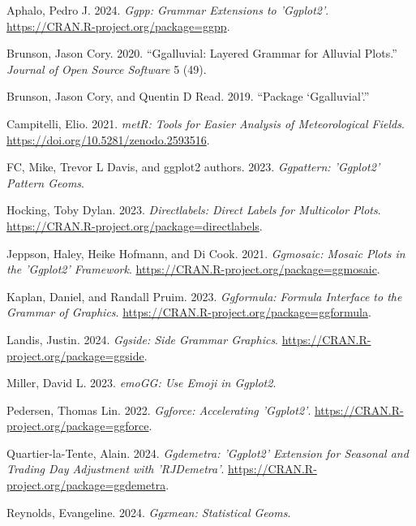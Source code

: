\documentclass[
  letterpaper,
  DIV=11,
  numbers=noendperiod]{scrreprt}
\newlength{\cslhangindent}
\newenvironment{CSLReferences}[2] %
 {\begin{list}{}{%
  \setlength{\itemindent}{0pt}
  \setlength{\leftmargin}{0pt}
  \setlength{\parsep}{0pt}
  \ifodd #1
   \setlength{\leftmargin}{\cslhangindent}
   \setlength{\itemindent}{-1\cslhangindent}
  \fi
  \setlength{\itemsep}{#2\baselineskip}}}
 {\end{list}}
\begin{document}
\label{refs}
\begin{CSLReferences}{1}{0}
Aphalo, Pedro J. 2024. \emph{Ggpp: Grammar Extensions to 'Ggplot2'}.
\url{https://CRAN.R-project.org/package=ggpp}.

Brunson, Jason Cory. 2020. {``Ggalluvial: Layered Grammar for Alluvial
Plots.''} \emph{Journal of Open Source Software} 5 (49).

Brunson, Jason Cory, and Quentin D Read. 2019. {``Package
{`Ggalluvial'}.''}

Campitelli, Elio. 2021. \emph{metR: Tools for Easier Analysis of
Meteorological Fields}. \url{https://doi.org/10.5281/zenodo.2593516}.

FC, Mike, Trevor L Davis, and ggplot2 authors. 2023. \emph{Ggpattern:
'Ggplot2' Pattern Geoms}.

Hocking, Toby Dylan. 2023. \emph{Directlabels: Direct Labels for
Multicolor Plots}.
\url{https://CRAN.R-project.org/package=directlabels}.

Jeppson, Haley, Heike Hofmann, and Di Cook. 2021. \emph{Ggmosaic: Mosaic
Plots in the 'Ggplot2' Framework}.
\url{https://CRAN.R-project.org/package=ggmosaic}.

Kaplan, Daniel, and Randall Pruim. 2023. \emph{Ggformula: Formula
Interface to the Grammar of Graphics}.
\url{https://CRAN.R-project.org/package=ggformula}.

Landis, Justin. 2024. \emph{Ggside: Side Grammar Graphics}.
\url{https://CRAN.R-project.org/package=ggside}.

Miller, David L. 2023. \emph{emoGG: Use Emoji in Ggplot2}.

Pedersen, Thomas Lin. 2022. \emph{Ggforce: Accelerating 'Ggplot2'}.
\url{https://CRAN.R-project.org/package=ggforce}.

Quartier-la-Tente, Alain. 2024. \emph{Ggdemetra: 'Ggplot2' Extension for
Seasonal and Trading Day Adjustment with 'RJDemetra'}.
\url{https://CRAN.R-project.org/package=ggdemetra}.

Reynolds, Evangeline. 2024. \emph{Ggxmean: Statistical Geoms}.


\end{CSLReferences}
\end{document}
